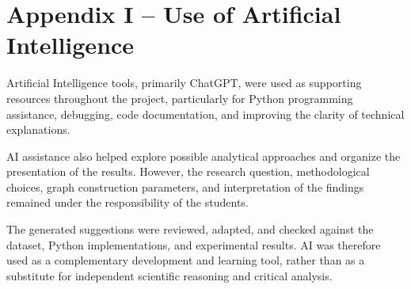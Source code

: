 \documentclass[10pt,a4paper]{article}
\begin{document}
\section*{Appendix I -- Use of Artificial Intelligence}
\label{app:ai_usage}

Artificial Intelligence tools, primarily ChatGPT, were used
as supporting resources throughout the project, particularly
for Python programming assistance, debugging, code
documentation, and improving the clarity of technical
explanations.

AI assistance also helped explore possible analytical
approaches and organize the presentation of the results.
However, the research question, methodological choices,
graph construction parameters, and interpretation of the
findings remained under the responsibility of the students.

The generated suggestions were reviewed, adapted, and
checked against the dataset, Python implementations, and
experimental results. AI was therefore used as a
complementary development and learning tool, rather than
as a substitute for independent scientific reasoning and
critical analysis.

\end{document}
